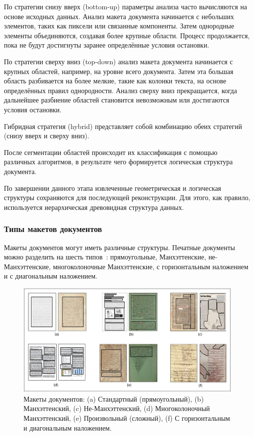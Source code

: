 По стратегии снизу вверх (bottom-up) параметры анализа часто вычисляются на основе исходных данных.
Анализ макета документа начинается с небольших элементов, таких как пиксели или связанные компоненты.
Затем однородные элементы объединяются, создавая более крупные области.
Процесс продолжается, пока не будут достигнуты заранее определённые условия остановки.

По стратегии сверху вниз (top-down) анализ макета документа начинается с крупных областей, например, на уровне всего документа.
Затем эта большая область разбивается на более мелкие, такие как колонки текста, на основе определённых правил однородности.
Анализ сверху вниз прекращается, когда дальнейшее разбиение областей становится невозможным или достигаются условия остановки.

Гибридная стратегия (hybrid) представляет собой комбинацию обеих стратегий (снизу вверх и сверху вниз).~\cite{dla-survey}

После сегментации областей происходит их классификация с помощью различных алгоритмов, в результате чего формируется логическая структура документа.

По завершении данного этапа извлеченные геометрическая и логическая структуры сохраняются для последующей реконструкции.
Для этого, как правило, используется иерархическая древовидная структура данных.~\cite{dla-book}

\subsubsection{Типы макетов документов}


Макеты документов могут иметь различные структуры.
Печатные документы можно разделить на шесть типов~\cite{kise}: прямоугольные, Манхэттенские, не-Манхэттенские, многоколоночные Манхэттенские, с горизонтальным наложением и с диагональным наложением.

\begin{figure}[H]
	\centering
    \includegraphics[width=\textwidth]{img/layouts.png}
    \caption{Макеты документов: (a) Стандартный (прямоугольный), (b) Манхэттенский, (c) Не-Манхэттенский, (d) Многоколоночный Манхэттенский, (e) Произвольный (сложный), (f) С горизонтальным и диагональным наложением.~\cite{dla-survey}}
	\label{fig:layouts}
\end{figure}

